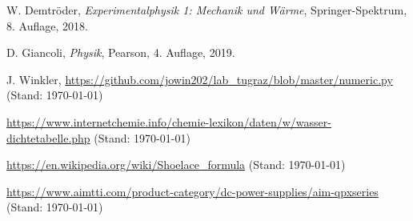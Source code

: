 \documentclass{article}
\begin{document}
\begin{thebibliography}{9}
 W. Demtröder, \emph{Experimentalphysik 1: Mechanik und Wärme}, Springer-Spektrum, 8. Auflage, 2018.

 D. Giancoli, \emph{Physik}, Pearson, 4. Auflage, 2019.

 J. Winkler, \url{https://github.com/jowin202/lab_tugraz/blob/master/numeric.py} (Stand: \today)

 \url{https://www.internetchemie.info/chemie-lexikon/daten/w/wasser-dichtetabelle.php} (Stand: \today)


 \url{https://en.wikipedia.org/wiki/Shoelace_formula} (Stand: \today)

 \url{https://www.aimtti.com/product-category/dc-power-supplies/aim-qpxseries} (Stand: \today)


\end{thebibliography}
\end{document}

